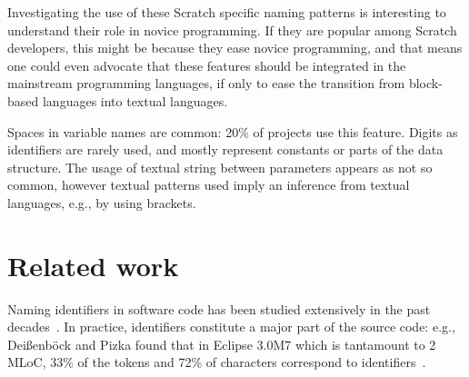 \documentclass[conference]{IEEEtran}
\begin{document}
Investigating the use of these Scratch specific naming patterns is interesting to understand their role in novice programming. If they are popular among Scratch developers, this might be because they ease novice programming, and that means one could even advocate that these features should be integrated in the mainstream programming languages, if only to ease the transition from block-based languages into textual languages.

\begin{framed}
 Spaces in variable names are common: 20\% of projects use this feature. 
 Digits as identifiers are rarely used, and mostly represent constants or parts of the data structure.
 The usage of textual string between parameters appears as not so common, however textual patterns used imply an inference from textual languages, e.g., by using brackets. 
\end{framed}

\section{Related work}
Naming identifiers in software code has been studied extensively in the past decades~\cite{AmanASK15,AnquetilL98,AvidanF17,Beniamini,ButlerWYS10,CaprileT00,HofmeisterSH17,LawrieMFB07,LunguK13,ScannielloR13,TakangGM96,Teasley,TramontanaRS14}. 
In practice, identifiers constitute a major part of the source code: e.g., Dei{\ss}enb{\"o}ck and Pizka found that in Eclipse 3.0M7 which is tantamount to 2 MLoC, 33\% of the tokens and 72\% of characters correspond to identifiers~\cite{Deissenbock}. 
\end{document}
